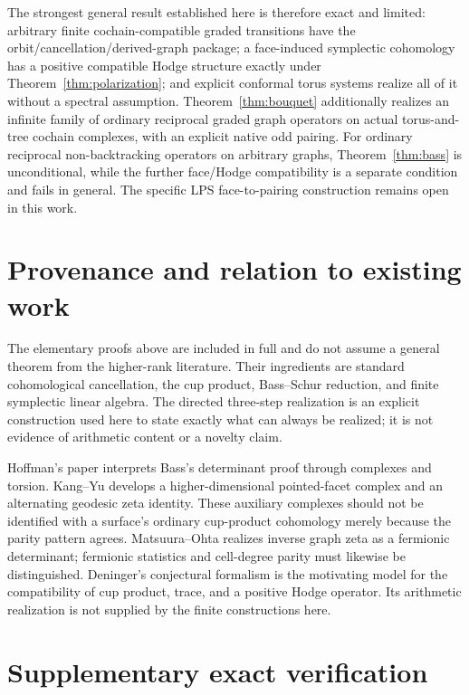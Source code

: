 \documentclass[11pt,a4paper]{article}
\theoremstyle{remark}\newtheorem{remark}[definition]{Remark}
\begin{document}
The strongest general result established here is therefore exact and limited: arbitrary finite cochain-compatible graded transitions have the orbit/cancellation/derived-graph package; a face-induced symplectic cohomology has a positive compatible Hodge structure exactly under Theorem~\ref{thm:polarization}; and explicit conformal torus systems realize all of it without a spectral assumption. Theorem~\ref{thm:bouquet} additionally realizes an infinite family of ordinary reciprocal graded graph operators on actual torus-and-tree cochain complexes, with an explicit native odd pairing. For ordinary reciprocal non-backtracking operators on arbitrary graphs, Theorem~\ref{thm:bass} is unconditional, while the further face/Hodge compatibility is a separate condition and fails in general. The specific LPS face-to-pairing construction remains open in this work.

\section{Provenance and relation to existing work}

The elementary proofs above are included in full and do not assume a general theorem from the higher-rank literature. Their ingredients are standard cohomological cancellation, the cup product, Bass--Schur reduction, and finite symplectic linear algebra. The directed three-step realization is an explicit construction used here to state exactly what can always be realized; it is not evidence of arithmetic content or a novelty claim.

Hoffman's paper \cite{hoffman} interprets Bass's determinant proof through complexes and torsion. Kang--Yu \cite{kangyu} develops a higher-dimensional pointed-facet complex and an alternating geodesic zeta identity. These auxiliary complexes should not be identified with a surface's ordinary cup-product cohomology merely because the parity pattern agrees. Matsuura--Ohta \cite{matsuura} realizes inverse graph zeta as a fermionic determinant; fermionic statistics and cell-degree parity must likewise be distinguished. Deninger's conjectural formalism \cite{deninger} is the motivating model for the compatibility of cup product, trace, and a positive Hodge operator. Its arithmetic realization is not supplied by the finite constructions here.

\section{Supplementary exact verification}
\end{document}
